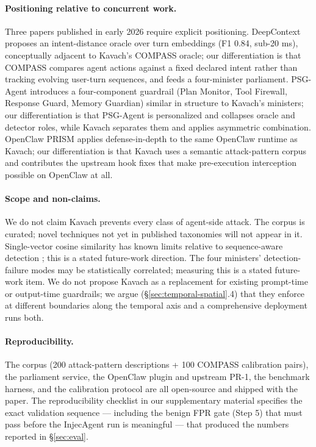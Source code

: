 \paragraph{Positioning relative to concurrent work.}
Three papers published in early 2026 require explicit positioning. DeepContext
\cite{albrethsen2026deepcontext} proposes an intent-distance oracle over turn
embeddings (F1 0.84, sub-20 ms), conceptually adjacent to Kavach's COMPASS
oracle; our differentiation is that COMPASS compares agent actions against a
fixed declared intent rather than tracking evolving user-turn sequences, and
feeds a four-minister parliament. PSG-Agent \cite{psgagent2026} introduces a
four-component guardrail (Plan Monitor, Tool Firewall, Response Guard, Memory
Guardian) similar in structure to Kavach's ministers; our differentiation is
that PSG-Agent is personalized and collapses oracle and detector roles, while
Kavach separates them and applies asymmetric combination. OpenClaw PRISM
\cite{prism2026} applies defense-in-depth to the same OpenClaw runtime as Kavach;
our differentiation is that Kavach uses a semantic attack-pattern corpus and
contributes the upstream hook fixes that make pre-execution interception possible
on OpenClaw at all.

\paragraph{Scope and non-claims.}
We do not claim Kavach prevents every class of agent-side attack. The corpus is
curated; novel techniques not yet in published taxonomies will not appear in it.
Single-vector cosine similarity has known limits relative to sequence-aware
detection \cite{advani2026trajectoryguard}; this is a stated future-work
direction. The four ministers' detection-failure modes may be statistically
correlated; measuring this is a stated future-work item. We do not propose
Kavach as a replacement for existing prompt-time or output-time guardrails; we
argue (\S\ref{sec:temporal-spatial}.4) that they enforce at different boundaries
along the temporal axis and a comprehensive deployment runs both.

\paragraph{Reproducibility.}
The corpus (200 attack-pattern descriptions + 100 COMPASS calibration pairs),
the parliament service, the OpenClaw plugin and upstream PR-1, the benchmark
harness, and the calibration protocol are all open-source and shipped with the
paper. The reproducibility checklist in our supplementary material specifies the
exact validation sequence — including the benign FPR gate (Step 5) that must
pass before the InjecAgent run is meaningful — that produced the numbers
reported in \S\ref{sec:eval}.
